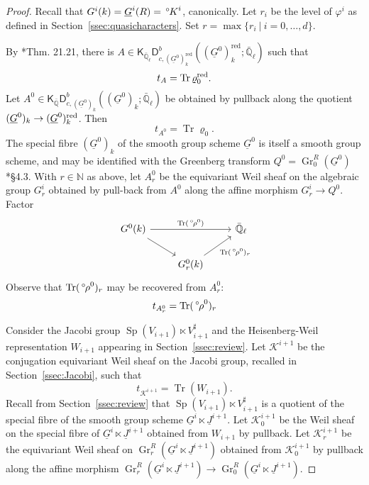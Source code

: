\documentclass[10pt]{amsart}
\theoremstyle{plain}
\theoremstyle{definition}
\newcommand{\NN}{{\mathbb{N}}}
\newcommand{\QQ}{{\mathbb{Q}}}
\newcommand{\EE}{\mathbb{\bar Q}_\ell}
\newcommand{\bFq}{\bar{k}}
\newcommand{\Fq}{k}
\DeclareMathOperator{\Gr}{Gr}
\DeclareMathOperator{\trace}{Tr}
\newcommand{\tq}{{\ \vert\ }}
\newcommand{\trFrob}[1]{t_{#1}}
\newcommand{\cs}[1]{{\mathcal{#1}}}
\newcommand{\red}{^{\operatorname{red}}}
\newcommand{\Sp}{{\operatorname{Sp}}}
\newcommand{\oK}{{\,^\circ \hskip-1pt K}}
\newcommand{\orho}{{\,^\circ \hskip-1pt \rho}}
\begin{document}
\begin{proof}
Recall that $G^i(\Fq) = \underline{G}^i(R) = \oK^i$, canonically.
Let $r_i$ be the level of $\varphi^i$ as defined in Section~\ref{ssec:quasicharacters}. 
Set $r = \max\{ r_i \tq i=0, \ldots ,d\}$.

By \cite{lusztig:disconnected4}*{Thm. 21.21}, there is $A \in \mathsf{K}_{\EE}\mathsf{D}^b_{c,(\underline{G}^0)_\Fq\red}((\underline{G}^0)_\Fq\red;\EE)$ such that 
\[
\trFrob{A} = \trace \varrho_0^\reductive.
\]
%
Let $A^0\in \mathsf{K}_{\bar\QQ}\mathsf{D}^b_{c,(\underline{G}^0)_\Fq}((\underline{G}^0)_\Fq;\EE)$ be obtained by pullback along the quotient $(\underline{G}^0)_\Fq \to (\underline{G}^0)_\Fq^\reductive$.
Then 
\[
\trFrob{A^0} = \trace \varrho_0.
\]
The special fibre $(\underline{G}^0)_\Fq$ of the smooth group scheme $\underline{G}^0$ is itself a smooth group scheme, and may be identified with the Greenberg transform $Q^0 = \Gr^{R}_0(\underline{G}^0)$ \cite{cunningham-roe:13a}*{\S 4.3}. 
With $r\in \NN$ as above, let ${A}_r^0$ be the equivariant Weil sheaf on the algebraic group $G_r^i$ obtained by pull-back from $A^0$ along the affine morphism $G_r^i \to Q^0$.
Factor
\begin{equation}\label{eqn:tracerho}
\begin{tikzcd}
G^0(\Fq) \arrow{rr}{\trace(\orho^0)} \arrow{rd} && \EE \\
& G_r^0(\Fq) \arrow{ru}[swap]{\trace(\orho^0)_r} 
\end{tikzcd}
\end{equation}
Observe that $\trace(\orho^0)_r$ may be recovered from ${A}_r^0$:
\[
\trFrob{{A}^0_r} = \trace(\orho^0)_r
\]

Consider the Jacobi group $\Sp(V_{i+1})\ltimes V_{i+1}^\sharp$ and the Heisenberg-Weil representation $W_{i+1}$ appearing in Section~\ref{ssec:review}.
Let $\cs{K}^{i+1}$ be the conjugation equivariant Weil sheaf on the Jacobi group, recalled in Section~\ref{ssec:Jacobi}, such that
\[
\trFrob{\cs{K}^{i+1}} = \trace(W_{i+1}).
\]
Recall from Section~\ref{ssec:review} that $\Sp(V_{i+1})\ltimes V_{i+1}^\sharp$ is a quotient of the special fibre of the smooth group scheme $\underline{G}^{i} \ltimes \underline{J}^{i+1}$.
Let $\cs{K}_0^{i+1}$ be the Weil sheaf on the special fibre of $\underline{G}^{i} \ltimes \underline{J}^{i+1}$ obtained from $W_{i+1}$ by pullback. 
Let $\cs{K}_r^{i+1}$ be the equivariant Weil sheaf on $\Gr^{R}_r(\underline{G}^{i} \ltimes \underline{J}^{i+1})$ obtained from $\cs{K}_0^{i+1}$ by pullback along the affine morphism
$\Gr^{R}_r(\underline{G}^{i} \ltimes \underline{J}^{i+1}) \to \Gr^{R}_0(\underline{G}^{i} \ltimes \underline{J}^{i+1})$.


\end{proof}
\end{document}
